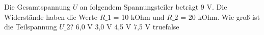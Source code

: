     {Die Gesamtspannung $U$ an folgendem Spannungsteiler beträgt 9 V. Die Widerstände haben die Werte $R\_1$ = 10 kOhm und $R\_2$ = 20 kOhm. Wie groß ist die Teilspannung $U\_2$?}
    {6,0 V}
    {3,0 V}
    {4,5 V}
    {7,5 V}
    {true}{false}